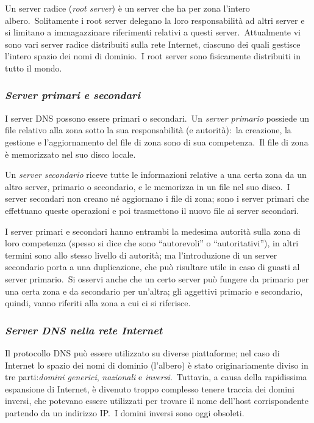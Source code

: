 Un server radice (\emph{root server}) è un server che ha per zona l'intero albero.\
Solitamente i root server delegano la loro responsabilità ad altri server e si limitano a immagazzinare riferimenti relativi a questi server.\
Attualmente vi sono vari server radice distribuiti sulla rete Internet, ciascuno dei quali gestisce l'intero spazio dei nomi di dominio.\
I root server sono fisicamente distribuiti in tutto il mondo.

\subsubsection{\emph{Server primari e secondari}}

I server DNS possono essere primari o secondari.\
Un \emph{server primario} possiede un file relativo alla zona sotto la sua responsabilità (e autorità):\ la creazione, la gestione e l'aggiornamento del file di zona sono di sua competenza.\
Il file di zona è memorizzato nel suo disco locale.

Un \emph{server secondario} riceve tutte le informazioni relative a una certa zona da un altro server, primario o secondario, e le memorizza in un file nel suo disco.\
I server secondari non creano né aggiornano i file di zona; sono i server primari che effettuano queste operazioni e poi trasmettono il nuovo file ai server secondari.

I server primari e secondari hanno entrambi la medesima autorità sulla zona di loro competenza (spesso si dice che sono ``autorevoli'' o ``autoritativi''), in altri termini sono allo stesso livello di autorità; ma l'introduzione di un server secondario porta a una duplicazione, che può risultare utile in caso di guasti al server primario.\
Si osservi anche che un certo server può fungere da primario per una certa zona e da secondario per un'altra; gli aggettivi primario e secondario, quindi, vanno riferiti alla zona a cui ci si riferisce.

\subsubsection{\emph{Server DNS nella rete Internet}}

Il protocollo DNS può essere utilizzato su diverse piattaforme; nel caso di Internet lo spazio dei nomi di dominio (l'albero) è stato originariamente diviso in tre parti:\emph{domini generici}, \emph{nazionali} e \emph{inversi}.\
Tuttavia, a causa della rapidissima espansione di Internet, è divenuto troppo complesso tenere traccia dei domini inversi, che potevano essere utilizzati per trovare il nome dell'host corrispondente partendo da un indirizzo IP.\
I domini inversi sono oggi obsoleti.


